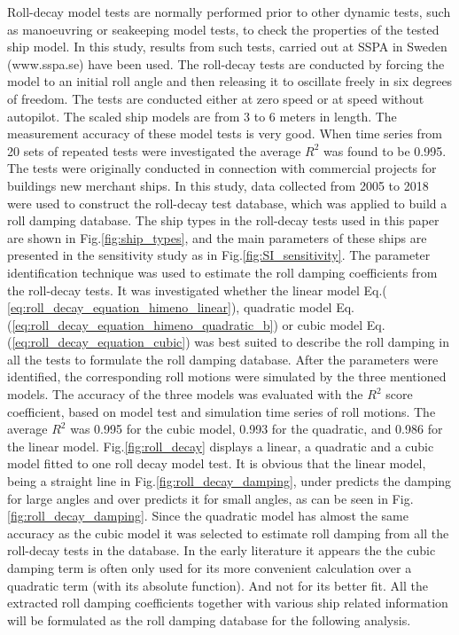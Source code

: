 Roll-decay model tests are normally performed prior to other dynamic tests, such as manoeuvring or seakeeping model tests, to check the properties of the tested ship model. In this study, results from such tests, carried out at SSPA in Sweden (www.sspa.se) have been used. The roll-decay tests are conducted by forcing the model to an initial roll angle and then releasing it to oscillate freely in six degrees of freedom. The tests are conducted either  at zero speed or at speed without autopilot. The scaled ship models are from 3 to 6 meters in  length. The measurement accuracy of these model tests is very good. When time series from 20 sets of repeated tests were investigated the average $R^2$ was found to be 0.995. The tests were originally conducted in connection with commercial projects for buildings new merchant ships. In this study, data collected from 2005 to 2018 were used to construct the roll-decay test database, which was applied to build a roll damping database. The ship types in the roll-decay tests used in this paper are  shown in Fig.\ref{fig:ship_types}, and the main parameters of these ships are presented in the sensitivity study as in Fig.\ref{fig:SI_sensitivity}. 
The parameter identification technique was used to estimate the roll damping coefficients from the roll-decay tests. It was investigated whether the linear model Eq.( \ref{eq:roll_decay_equation_himeno_linear}), quadratic model Eq.(\ref{eq:roll_decay_equation_himeno_quadratic_b}) or cubic model Eq.(\ref{eq:roll_decay_equation_cubic}) was best suited to describe the roll damping in all the tests to formulate the roll damping database. After the parameters were identified, the corresponding roll motions were simulated by the three mentioned models. The accuracy of the three models was evaluated with the $R^2$ score coefficient, based on model test and simulation time series of roll motions.
The average $R^2$ was 0.995 for the cubic model, 0.993 for the quadratic, and 0.986 for the linear model. Fig.\ref{fig:roll_decay} displays a linear, a quadratic and a cubic model fitted to one roll decay model test. It is obvious that the linear model, being a straight line in Fig.\ref{fig:roll_decay_damping}, under predicts the damping for large angles and over predicts it for small angles, as can be seen in Fig.\ref{fig:roll_decay_damping}. Since the quadratic model has almost the same accuracy as the cubic model it was selected to estimate roll damping from all the roll-decay tests in the database. In the early literature it appears the the cubic damping term is often only used for its more convenient calculation over a quadratic term (with its absolute function). And not for its better fit. All the extracted roll damping coefficients together with various ship related information will be formulated as the roll damping database for the following analysis.

